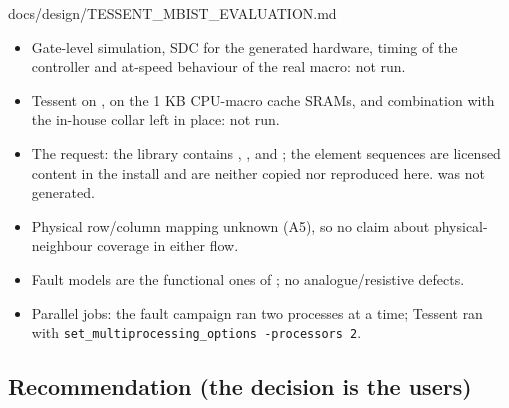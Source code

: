 \begin{relocated}{docs/design/TESSENT_MBIST_EVALUATION.md}
\begin{itemize}
\tightlist
\item
  Gate-level simulation, SDC for the generated hardware, timing of the
  controller and at-speed behaviour of the real macro: not run.
\item
  Tessent on , on the 1 KB CPU-macro cache SRAMs, and
  combination with the in-house collar left in place: not run.
\item
  The  request: the library contains ,
  ,  and ;
  the element sequences are licensed content in the install and are
  neither copied nor reproduced here.  was not
  generated.
\item
  Physical row/\allowbreak{}column mapping unknown (A5), so no claim
  about physical-neighbour coverage in either flow.
\item
  Fault models are the functional ones of ; no
  analogue/\allowbreak{}resistive defects.
\item
  Parallel jobs: the fault campaign ran two  processes at a
  time; Tessent ran with
  \texttt{set\_\allowbreak{}multiprocessing\_\allowbreak{}options\ -\allowbreak{}processors\ 2}.
\end{itemize}

\subsection{Recommendation (the decision is the
user\textquotesingle s)}\label{tm:dec:tessent-mbist-evaluation:9-recommendation-the-decision-is-the-users}


\end{relocated}
